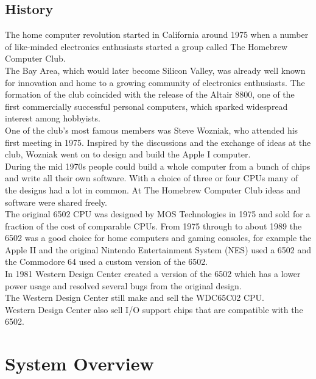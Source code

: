\documentclass{ol-softwaremanual}
\begin{document}
\pagebreak
\subsection{History}
The home computer revolution started in California around 1975 when a number of like-minded electronics enthusiasts started a group called The Homebrew Computer Club.\\

The Bay Area, which would later become Silicon Valley, was already well known for innovation and home to a growing community of electronics enthusiasts. The formation of the club coincided with the release of the Altair 8800, one of the first commercially successful personal computers, which sparked widespread interest among hobbyists.\\

One of the club's most famous members was Steve Wozniak, who attended his first meeting in 1975. Inspired by the discussions and the exchange of ideas at the club, Wozniak went on to design and build the Apple I computer.\\

During the mid 1970s people could build a whole computer from a bunch of chips and write all their own software. With a choice of three or four CPUs many of the designs had a lot in common. At The Homebrew Computer Club ideas and software were shared freely.\\

The original 6502 CPU was designed by MOS Technologies in 1975 and sold for a fraction of the cost of comparable CPUs. From 1975 through to about 1989 the 6502 was a good choice for home computers and gaming consoles, for example the Apple II and the original Nintendo Entertainment System (NES) used a 6502 and the Commodore 64 used a custom version of the 6502.\\

In 1981 Western Design Center created a version of the 6502 which has a lower power usage and resolved several bugs from the original design.\\
The Western Design Center still make and sell the WDC65C02 CPU.\\

Western Design Center also sell I/O support chips that are compatible with the 6502.\\
\pagebreak

\section{System Overview}
\end{document}
